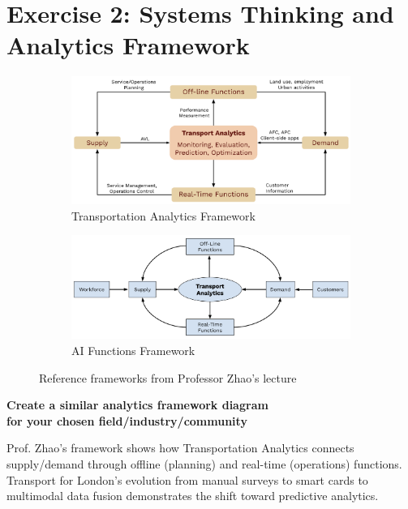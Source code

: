 \documentclass[11pt]{article}
\begin{document}
\section*{Exercise 2: Systems Thinking and Analytics Framework}

\begin{figure}[h]
\centering
\begin{subfigure}{0.48\textwidth}
\centering
\includegraphics[width=\textwidth]{transport_analytics_graph.png}
\caption{Transportation Analytics Framework}
\label{fig:transport}
\end{subfigure}
\hfill
\begin{subfigure}{0.48\textwidth}
\centering
\includegraphics[width=\textwidth]{ai_graph.png}
\caption{AI Functions Framework}
\label{fig:ai}
\end{subfigure}
\caption{Reference frameworks from Professor Zhao's lecture}
\label{fig:frameworks}
\end{figure}

\begin{center}
\textbf{\Large Create a similar analytics framework diagram \\
for your chosen field/industry/community}
\end{center}

Prof. Zhao's framework shows how Transportation Analytics connects supply/demand through offline (planning) and real-time (operations) functions. Transport for London's evolution from manual surveys to smart cards to multimodal data fusion demonstrates the shift toward predictive analytics.
\end{document}
